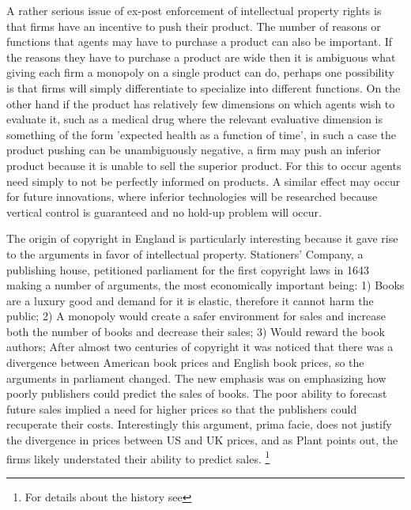 \documentclass[12pt]{article}
\numberwithin{equation}{section}
\begin{document}
A rather serious issue of ex-post enforcement of intellectual property rights is that firms have an incentive to push their product. The number of reasons or functions that agents may have to purchase a product can also be important. If the reasons they have to purchase a product are wide then it is ambiguous what giving each firm a monopoly on a single product can do, perhaps one possibility is that firms will simply differentiate to specialize into different functions. On the other hand if the product has relatively few dimensions on which agents wish to evaluate it, such as a medical drug where the relevant evaluative dimension is something of the form 'expected health as a function of time', in such a case the product pushing can be unambiguously negative, a firm may push an inferior product because it is unable to sell the superior product. For this to occur agents need simply to not be perfectly informed on products. A similar effect may occur for future innovations, where inferior technologies will be researched because vertical control is guaranteed and no hold-up problem will occur.

The origin of copyright in England is particularly interesting because it gave rise to the arguments in favor of intellectual property. Stationers' Company, a publishing house, petitioned parliament for the first copyright laws in 1643 making a number of arguments, the most economically important being: 1) Books are a luxury good and demand for it is elastic, therefore it cannot harm the public; 2) A monopoly would create a safer environment for sales and increase both the number of books and decrease their sales; 3) Would reward the book authors; After almost two centuries of copyright it was noticed that there was a divergence between American book prices and English book prices, so the arguments in parliament changed. The new emphasis was on emphasizing how poorly publishers could predict the sales of books. The poor ability to forecast future sales implied a need for higher prices so that the publishers could recuperate their costs. Interestingly this argument, prima facie, does  not justify the divergence in prices between US and UK prices, and as Plant points out, the firms likely understated their ability to predict sales. \footnote{For details about the history see\cite{Plant1934}}
\end{document}
